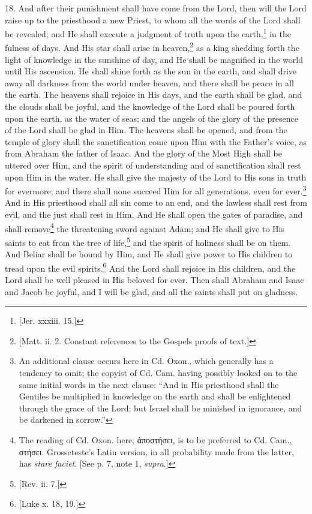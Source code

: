 18. And after their punishment shall have come from the Lord, then will the Lord raise up to the priesthood a new Priest, to whom all the words of the Lord shall be revealed; and He shall execute a judgment of truth upon the earth,\footnote{[Jer. xxxiii. 15.]} in the fulness of days. And His star shall arise in heaven,\footnote{[Matt. ii. 2. Constant references to the Gospels proofs of text.]} as a king shedding forth the light of knowledge in the sunshine of day, and He shall be magnified in the world until His ascension. He shall shine forth as the sun in the earth, and shall drive away all darkness from the world under heaven, and there shall be peace in all the earth. The heavens shall rejoice in His days, and the earth shall be glad, and the clouds shall be joyful, and the knowledge of the Lord shall be poured forth upon the earth, as the water of seas; and the angels of the glory of the presence of the Lord shall be glad in Him. The heavens shall be opened, and from the temple of glory shall the sanctification come upon Him with the Father’s voice, as from Abraham the father of Isaac. And the glory of the Most High shall be uttered over Him, and the spirit of understanding and of sanctification shall rest upon Him in the water. He shall give the majesty of the Lord to His sons in truth for evermore; and there shall none succeed Him for all generations, even for ever.\footnote{An additional clause occurs here in Cd. Oxon., which generally has a tendency to omit; the copyist of Cd. Cam. having possibly looked on to the same initial words in the next clause: “And in His priesthood shall the Gentiles be multiplied in knowledge on the earth and shall be enlightened through the grace of the Lord; but Israel shall be minished in ignorance, and be darkened in sorrow.”} And in His priesthood shall all sin come to an end, and the lawless shall rest from evil, and the just shall rest in Him. And He shall open the gates of paradise, and shall remove\footnote{The reading of Cd. Oxon. here, \textgreek{ἀποστήσει}, is to be preferred to Cd. Cam., \textgreek{στήσει}. Grosseteste’s Latin version, in all probability made from the latter, has \emph{stare faciet}. [See p. 7, note 1, \emph{supra}.]} the threatening sword against Adam; and He shall give to His saints to eat from the tree of life,\footnote{[Rev. ii. 7.]} and the spirit of holiness shall be on them. And Beliar shall be bound by Him, and He shall give power to His children to tread upon the evil spirits.\footnote{[Luke x. 18, 19.]} And the Lord shall rejoice in His children, and the Lord shall be well pleased in His beloved for ever. Then shall Abraham and Isaac and Jacob be joyful, and I will be glad, and all the saints shall put on gladness.

